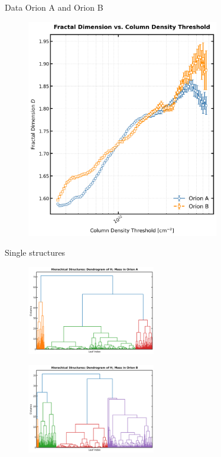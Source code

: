 Data Orion A and Orion B

\begin{figure}[t]
    \centering
    \includegraphics[width=0.75\textwidth]{figures/local_orion_A_B.png}
    \caption{}
    \label{fig:local_Orion_A_B}
\end{figure}

Single structures

\begin{figure}[t]
    \centering
    \includegraphics[width=0.5\textwidth]{figures/dendogram_A.png}
    \caption{}
    \label{fig:dendrogram_A}
\end{figure}

\begin{figure}[t]
    \centering
    \includegraphics[width=0.5\textwidth]{figures/dendogram_B.png}
    \caption{}
    \label{fig:dendrogram_B}
\end{figure}

